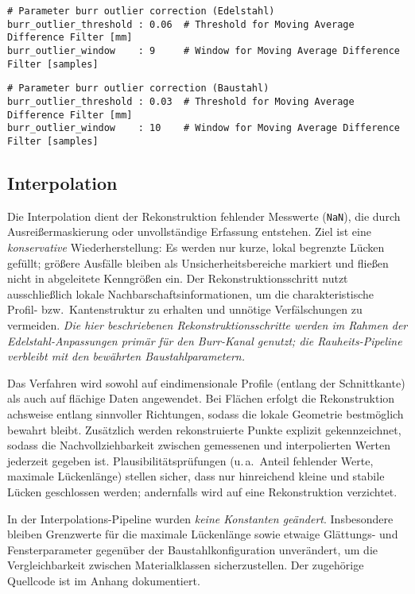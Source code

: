 \begin{lstlisting}[caption={Pipeline-Parameter Outlier Correction (Edelstahl, Burr-Kanal)}, label={lst:params-outlier-stainless}]
# Parameter burr outlier correction (Edelstahl)
burr_outlier_threshold : 0.06  # Threshold for Moving Average Difference Filter [mm]
burr_outlier_window    : 9     # Window for Moving Average Difference Filter [samples]
\end{lstlisting}

\begin{lstlisting}[caption={Pipeline-Parameter Outlier Correction (Baustahl, Burr-Kanal)}, label={lst:params-outlier-mild}]
# Parameter burr outlier correction (Baustahl)
burr_outlier_threshold : 0.03  # Threshold for Moving Average Difference Filter [mm]
burr_outlier_window    : 10    # Window for Moving Average Difference Filter [samples]
\end{lstlisting}

\subsection{Interpolation}

Die Interpolation dient der Rekonstruktion fehlender Messwerte (\texttt{NaN}), die durch Ausreißermaskierung oder unvollständige Erfassung entstehen. Ziel ist eine \emph{konservative} Wiederherstellung: Es werden nur kurze, lokal begrenzte Lücken gefüllt; größere Ausfälle bleiben als Unsicherheitsbereiche markiert und fließen nicht in abgeleitete Kenngrößen ein. Der Rekonstruktionsschritt nutzt ausschließlich lokale Nachbarschaftsinformationen, um die charakteristische Profil- bzw.\ Kantenstruktur zu erhalten und unnötige Verfälschungen zu vermeiden. \emph{Die hier beschriebenen Rekonstruktionsschritte werden im Rahmen der Edelstahl-Anpassungen primär für den Burr-Kanal genutzt; die Rauheits-Pipeline verbleibt mit den bewährten Baustahlparametern.}

Das Verfahren wird sowohl auf eindimensionale Profile (entlang der Schnittkante) als auch auf flächige Daten angewendet. Bei Flächen erfolgt die Rekonstruktion achsweise entlang sinnvoller Richtungen, sodass die lokale Geometrie bestmöglich bewahrt bleibt. Zusätzlich werden rekonstruierte Punkte explizit gekennzeichnet, sodass die Nachvollziehbarkeit zwischen gemessenen und interpolierten Werten jederzeit gegeben ist. Plausibilitätsprüfungen (u.\,a.\ Anteil fehlender Werte, maximale Lückenlänge) stellen sicher, dass nur hinreichend kleine und stabile Lücken geschlossen werden; andernfalls wird auf eine Rekonstruktion verzichtet.

In der Interpolations-Pipeline wurden \emph{keine Konstanten geändert}. Insbesondere bleiben Grenzwerte für die maximale Lückenlänge sowie etwaige Glättungs- und Fensterparameter gegenüber der Baustahlkonfiguration unverändert, um die Vergleichbarkeit zwischen Materialklassen sicherzustellen. Der zugehörige Quellcode ist im Anhang dokumentiert.
